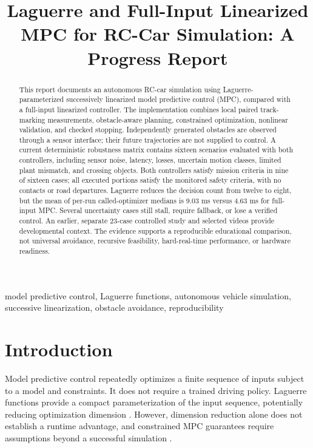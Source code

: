 \documentclass[conference]{IEEEtran}
\title{Laguerre and Full-Input Linearized MPC for RC-Car Simulation:
A Progress Report}
\author{\IEEEauthorblockN{arch1703}
\IEEEauthorblockA{Project maintainer\\
Technical progress report --- 28 October 2026\\
\url{https://github.com/arch1703/Laguerre_MPC_Car}}}
\begin{document}
\maketitle

\begin{abstract}
This report documents an autonomous RC-car simulation using Laguerre-parameterized
successively linearized model predictive control (MPC), compared with a
full-input linearized controller. The implementation combines local paired
track-marking measurements, obstacle-aware planning, constrained optimization,
nonlinear validation, and checked stopping. Independently generated obstacles
are observed through a sensor interface; their future trajectories are not
supplied to control. A current deterministic robustness matrix contains sixteen
scenarios evaluated with both controllers, including sensor noise, latency,
losses, uncertain motion classes, limited plant mismatch, and crossing objects.
Both controllers satisfy mission criteria in nine of sixteen cases; all
executed portions satisfy the monitored safety criteria, with no contacts or
road departures. Laguerre reduces the decision count from twelve to eight, but
the mean of per-run called-optimizer medians is 9.03 ms versus 4.63 ms for
full-input MPC. Several uncertainty cases still stall, require fallback, or
lose a verified control. An earlier, separate 23-case controlled study and
selected videos provide developmental context. The evidence supports a
reproducible educational comparison, not universal avoidance, recursive
feasibility, hard-real-time performance, or hardware readiness.
\end{abstract}

\begin{IEEEkeywords}
model predictive control, Laguerre functions, autonomous vehicle simulation,
successive linearization, obstacle avoidance, reproducibility
\end{IEEEkeywords}

\section{Introduction}
Model predictive control repeatedly optimizes a finite sequence of inputs
subject to a model and constraints. It does not require a trained driving
policy. Laguerre functions provide a compact parameterization of the input
sequence, potentially reducing optimization dimension \cite{wang}. However,
dimension reduction alone does not establish a runtime advantage, and
constrained MPC guarantees require assumptions beyond a successful simulation
\cite{mayne}.
\end{document}
